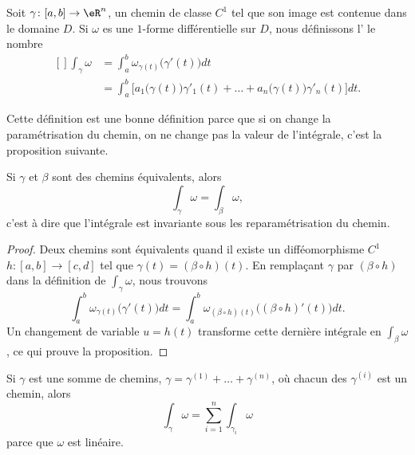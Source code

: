 \begin{definition}
	Soit $\gamma\colon [a,b]\to \eR^n$, un chemin de classe $C^1$ tel que son image est contenue dans le domaine $D$. Si $\omega$ es une $1$-forme différentielle sur $D$, nous définissons l' le nombre
	\begin{equation}
		\begin{aligned}[]
			\int_{\gamma}\omega&=\int_a^b\omega_{\gamma(t)}\big( \gamma'(t) \big)dt\\
				&=\int_a^b\Big[ a_1\big( \gamma(t) \big)\gamma'_1(t)+\ldots +  a_n\big( \gamma(t) \big)\gamma'_n(t) \Big]dt.
		\end{aligned}
	\end{equation}
\end{definition}

Cette définition est une bonne définition parce que si on change la paramétrisation du chemin, on ne change pas la valeur de l'intégrale, c'est la proposition suivante.
\begin{proposition}
	Si $\gamma$ et $\beta$ sont des chemins équivalents, alors
	\begin{equation}
		\int_{\gamma}\omega=\int_{\beta}\omega,
	\end{equation}
	c'est à dire que l'intégrale est invariante sous les reparamétrisation du chemin.
\end{proposition}
\begin{proof}
	Deux chemins sont équivalents quand il existe un difféomorphisme $C^1$ $h\colon [a,b]\to [c,d]$ tel que $\gamma(t)=(\beta\circ h)(t)$. En remplaçant $\gamma$ par $(\beta\circ h)$ dans la définition de $\int_{\gamma}\omega$, nous trouvons
	\begin{equation}
		\int_a^b\omega_{\gamma(t)}\big( \gamma'(t) \big)dt=\int_a^b\omega_{(\beta\circ h)(t)}\big( (\beta\circ h)'(t) \big)dt.
	\end{equation}
	Un changement de variable $u=h(t)$ transforme cette dernière intégrale en $\int_{\beta}\omega$, ce qui prouve la proposition.
\end{proof}

\begin{remark}
	Si $\gamma$ est une somme de chemins, $\gamma=\gamma^{(1)}+\ldots+\gamma^{(n)}$, où chacun des $\gamma^{(i)}$ est un chemin, alors
	\begin{equation}
		\int_{\gamma}\omega=\sum_{i=1}^n\int_{\gamma_i}\omega
	\end{equation}
	parce que $\omega$ est linéaire.
\end{remark}

